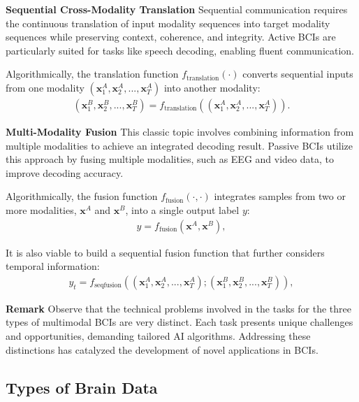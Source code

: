 \documentclass[journal]{IEEEtran}
\begin{document}
\textbf{Sequential Cross-Modality Translation} Sequential communication requires the continuous translation of input modality sequences into target modality sequences while preserving context, coherence, and integrity. Active BCIs are particularly suited for tasks like speech decoding, enabling fluent communication.

Algorithmically, the translation function $f_{\text{translation}}(\cdot)$ converts sequential inputs from one modality $(\mathbf{x}_{1}^{A}, \mathbf{x}_{2}^{A}, ..., \mathbf{x}_{T}^{A})$ into another modality:
\begin{align}
(\mathbf{x}_{1}^{B}, \mathbf{x}_{2}^{B}, ..., \mathbf{x}_{T}^{B}) = f_{\text{translation}}\left((\mathbf{x}_{1}^{A}, \mathbf{x}_{2}^{A}, ..., \mathbf{x}_{T}^{A})\right).
\end{align}

\textbf{Multi-Modality Fusion} This classic topic involves combining information from multiple modalities to achieve an integrated decoding result. Passive BCIs utilize this approach by fusing multiple modalities, such as EEG and video data, to improve decoding accuracy.

Algorithmically, the fusion function $f_{\text{fusion}}(\cdot, \cdot)$ integrates samples from two or more modalities, $\mathbf{x}^{A}$ and $\mathbf{x}^{B}$, into a single output label $y$:
\begin{align}
y = f_{\text{fusion}}(\mathbf{x}^{A}, \mathbf{x}^{B}),
\end{align}

It is also viable to build a sequential fusion function that further considers temporal information:
\begin{align}
y_t = f_{\text{seqfusion}}\left((\mathbf{x}_{1}^{A}, \mathbf{x}_{2}^{A}, ..., \mathbf{x}_{T}^{A}); (\mathbf{x}_{1}^{B}, \mathbf{x}_{2}^{B}, ..., \mathbf{x}_{T}^{B})\right),
\end{align}

\textbf{Remark} Observe that the technical problems involved in the tasks for the three types of multimodal BCIs are very distinct. Each task presents unique challenges and opportunities, demanding tailored AI algorithms. Addressing these distinctions has catalyzed the development of novel applications in BCIs.

\subsection{Types of Brain Data} \label{sect:characteristics}
\end{document}
